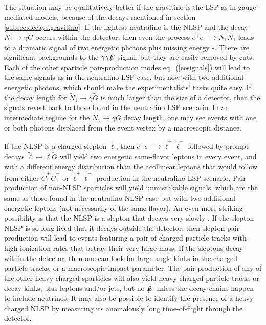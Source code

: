 \documentclass[12pt]{article}
\def\stilde{\widetilde}
\def\G{\stilde G}
\def\NI{\stilde N_1}
\def\Etot{{\slashchar{E}}}
\def\slashchar#1{\setbox0=\hbox{$#1$}           %
   \dimen0=\wd0                                 %
   \setbox1=\hbox{/} \dimen1=\wd1               %
   \ifdim\dimen0>\dimen1                        %
      \rlap{\hbox to \dimen0{\hfil/\hfil}}      %
      #1                                        %
   \else                                        %
      \rlap{\hbox to \dimen1{\hfil$#1$\hfil}}   %
      /                                         %
   \fi}                                        %
\begin{document}
The situation may be qualitatively better if the 
gravitino is the LSP as in gauge-mediated models, because of the decays 
mentioned in section \ref{subsec:decays.gravitino}. If the lightest 
neutralino is the NLSP and the decay $\NI\rightarrow\gamma\G$ occurs 
within the detector, then even the process $e^+e^-\rightarrow \NI\NI$ 
leads to a dramatic signal of two energetic photons plus missing energy 
\cite{eeGMSBsignal}-\cite{AKKMM2}. 
There are significant backgrounds to the 
$\gamma\gamma\Etot$ signal, but they are easily removed by cuts. Each of 
the other sparticle pair-production modes eq.~(\ref{eesignals}) will lead 
to the same signals as in the neutralino LSP case, but now with two 
additional energetic photons, which should make the experimentalists' 
tasks quite easy. If the decay length for $\NI\rightarrow\gamma\G$ is much 
larger than the size of a detector, then the signals revert back to those 
found in the neutralino LSP scenario. In an intermediate regime for the 
$\NI\rightarrow\gamma\G$ decay length, one may see events with one or both 
photons displaced from the event vertex by a macroscopic distance.

If the NLSP is a charged slepton $\stilde \ell$, then $e^+e^-\rightarrow 
\stilde \ell^+\stilde \ell^-$ followed by prompt decays $\stilde 
\ell\rightarrow \ell \G$ will yield two energetic same-flavor leptons in 
every event, and with a different energy distribution than the acollinear 
leptons that would follow from either $\stilde C_1^+\stilde C_1^-$ or 
$\stilde \ell^+\stilde \ell^-$ production in the neutralino LSP scenario. 
Pair production of non-NLSP sparticles will yield unmistakable signals, 
which are the same as those found in the neutralino NLSP case but with two 
additional energetic leptons (not necessarily of the same flavor). An even 
more striking possibility is that the NLSP is a slepton that decays very 
slowly \cite{DDRT}. If the slepton NLSP is so long-lived that it decays 
outside the detector, then slepton pair production will lead to events 
featuring a pair of charged particle tracks with high ionization rates 
that betray their very large mass. If the sleptons decay within the 
detector, then one can look for large-angle
kinks in the charged particle tracks, or a 
macroscopic impact parameter. The pair production of any of the other 
heavy charged sparticles will also yield heavy charged particle tracks or 
decay kinks, plus leptons and/or jets, but no $\Etot$ unless the decay 
chains happen to include neutrinos. It may also be possible to identify 
the presence of a heavy charged NLSP by measuring its anomalously long 
time-of-flight through the detector.
\end{document}
